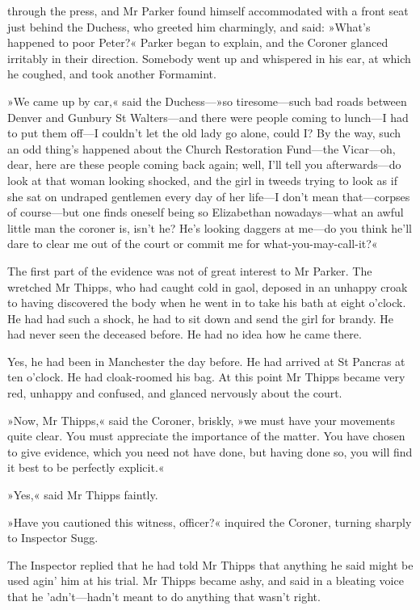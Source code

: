 through the press, and Mr Parker found himself accommodated with a front seat just behind the Duchess, who greeted him charmingly, and said: »What's happened to poor Peter?« Parker began to explain, and the Coroner glanced irritably in their direction. Somebody went up and whispered in his ear, at which he coughed, and took another Formamint.

»We came up by car,« said the Duchess---»so tiresome—such bad roads between Denver and Gunbury St Walters—and there were people coming to lunch—I had to put them off—I couldn't let the old lady go alone, could I? By the way, such an odd thing's happened about the Church Restoration Fund—the Vicar—oh, dear, here are these people coming back again; well, I'll tell you afterwards—do look at that woman looking shocked, and the girl in tweeds trying to look as if she sat on undraped gentlemen every day of her life—I don't mean that—corpses of course—but one finds oneself being so Elizabethan nowadays—what an awful little man the coroner is, isn't he? He's looking daggers at me—do you think he'll dare to clear me out of the court or commit me for what-you-may-call-it?«

The first part of the evidence was not of great interest to Mr Parker. The wretched Mr Thipps, who had caught cold in gaol, deposed in an unhappy croak to having discovered the body when he went in to take his bath at eight o'clock. He had had such a shock, he had to sit down and send the girl for brandy. He had never seen the deceased before. He had no idea how he came there.

Yes, he had been in Manchester the day before. He had arrived at St Pancras at ten o'clock. He had cloak-roomed his bag. At this point Mr Thipps became very red, unhappy and confused, and glanced nervously about the court.

»Now, Mr Thipps,« said the Coroner, briskly, »we must have your movements quite clear. You must appreciate the importance of the matter. You have chosen to give evidence, which you need not have done, but having done so, you will find it best to be perfectly explicit.«

»Yes,« said Mr Thipps faintly.

»Have you cautioned this witness, officer?« inquired the Coroner, turning sharply to Inspector Sugg.

The Inspector replied that he had told Mr Thipps that anything he said might be used agin' him at his trial. Mr Thipps became ashy, and said in a bleating voice that he 'adn't—hadn't meant to do anything that wasn't right.

